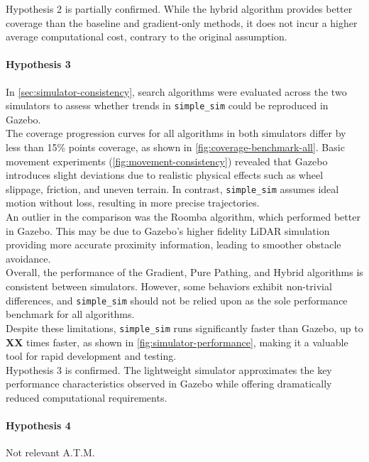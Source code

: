 Hypothesis 2 is partially confirmed. While the hybrid algorithm provides better coverage than the baseline and gradient-only methods, it does not incur a higher average computational cost, contrary to the original assumption.

\paragraph{Hypothesis 3}
In \cref{sec:simulator-consistency}, search algorithms were evaluated across the two simulators to assess whether trends in \texttt{simple\_sim} could be reproduced in Gazebo. \\

The coverage progression curves for all algorithms in both simulators differ by less than 15\% points coverage, as shown in \cref{fig:coverage-benchmark-all}. Basic movement experiments (\cref{fig:movement-consistency}) revealed that Gazebo introduces slight deviations due to realistic physical effects such as wheel slippage, friction, and uneven terrain. In contrast, \texttt{simple\_sim} assumes ideal motion without loss, resulting in more precise trajectories. \\

An outlier in the comparison was the Roomba algorithm, which performed better in Gazebo. This may be due to Gazebo’s higher fidelity LiDAR simulation providing more accurate proximity information, leading to smoother obstacle avoidance.\\

Overall, the performance of the Gradient, Pure Pathing, and Hybrid algorithms is consistent between simulators. However, some behaviors exhibit non-trivial differences, and \texttt{simple\_sim} should not be relied upon as the sole performance benchmark for all algorithms. \\

Despite these limitations, \texttt{simple\_sim} runs significantly faster than Gazebo, up to \textbf{XX} times faster, as shown in \cref{fig:simulator-performance}, making it a valuable tool for rapid development and testing. \\

Hypothesis 3 is confirmed. The lightweight simulator approximates the key performance characteristics observed in Gazebo while offering dramatically reduced computational requirements.

\paragraph{Hypothesis 4}
Not relevant A.T.M.
